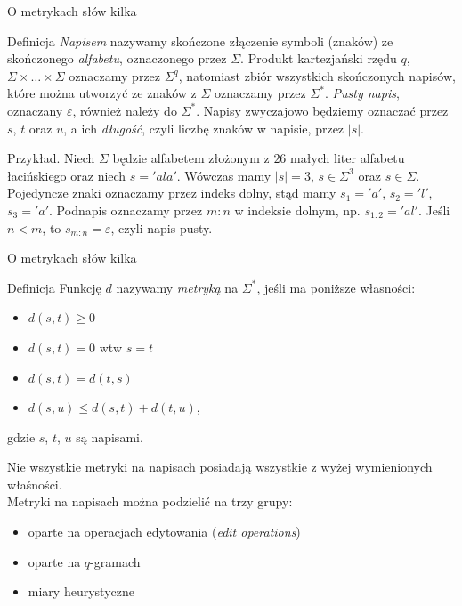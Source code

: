 \documentclass[11pt,pdftex,mathserif]{beamer}\usepackage[]{graphicx}\usepackage[]{color}
\theoremstyle{definition}
\begin{document}
\begin{frame}{O metrykach słów kilka}
\begin{block}{Definicja}
\emph{Napisem} nazywamy skończone złączenie symboli (znaków) ze skończonego \emph{alfabetu}, oznaczonego przez $\Sigma$. Produkt kartezjański rzędu $q$, $\Sigma\times\ldots\times\Sigma$ oznaczamy przez $\Sigma^q$, natomiast zbiór wszystkich skończonych napisów, które można utworzyć ze znaków z $\Sigma$ oznaczamy przez $\Sigma^*$. \emph{Pusty napis}, oznaczany $\varepsilon$, również należy do $\Sigma^*$. Napisy zwyczajowo będziemy oznaczać przez $s$, $t$ oraz $u$, a ich \emph{długość}, czyli liczbę znaków w napisie, przez $|s|$.
\end{block}
\pause
Przykład. Niech $\Sigma$ będzie alfabetem złożonym z $26$ małych liter alfabetu łacińskiego oraz niech $s = 'ala'$. Wówczas mamy $|s| = 3$, $s \in \Sigma^3$ oraz $s \in \Sigma$. Pojedyncze znaki oznaczamy przez indeks dolny, stąd mamy $s_1 = 'a'$, $s_2 = 'l'$, $s_3 = 'a'$. Podnapis oznaczamy przez $m:n$ w indeksie dolnym, np. $s_{1:2} = 'al'$. Jeśli $n < m$, to $s_{m:n} = \varepsilon$, czyli napis pusty.
\end{frame}


\begin{frame}{O metrykach słów kilka}
\begin{block}{Definicja}
Funkcję $d$ nazywamy \emph{metryką} na $\Sigma^*$, jeśli ma poniższe własności:
\begin{itemize}
\item $d(s,t) \geq 0$
\item $d(s,t) = 0$ wtw $s = t$
\item $d(s,t) = d(t,s)$
\item $d(s,u) \leq d(s,t) + d(t,u)$,
\end{itemize}
gdzie $s$, $t$, $u$ są napisami.
\end{block}
\pause
Nie wszystkie metryki na napisach posiadają wszystkie z wyżej wymienionych właśności.\\
\pause
Metryki na napisach można podzielić na trzy grupy:
\begin{itemize}
\item oparte na operacjach edytowania (\emph{edit operations})
\item oparte na $q$-gramach
\item miary heurystyczne
\end{itemize}
\end{frame}
\end{document}
